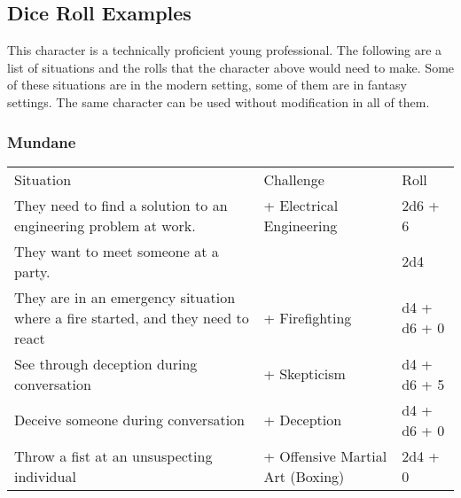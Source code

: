 \documentclass{LegrandOrangeTufteBook}
\begin{document}



\subsection*{Dice Roll Examples}

This character is a technically proficient young professional.
The following are a list of situations and the rolls that the character above would need to make.
Some of these situations are in the modern setting, some of them are in fantasy settings. The same character can be used without modification in all of them.

\subsubsection*{Mundane}

\begin{center}
	\begin{xltabular}{\textwidth}{Xll}
		Situation																		& Challenge 												& Roll \\
		They need to find a solution to an engineering problem at work.					&  + Electrical Engineering				& 2d6 + 6 \\
		They want to meet someone at a party.											& 								& 2d4 \\
		They are in an emergency situation where a fire started, and they need to react	&  + Firefighting 			& d4 + d6 + 0 \\
		See through deception during conversation										&  + Skepticism							& d4 + d6 + 5 \\
		Deceive someone during conversation 											&  + Deception						& d4 + d6 + 0 \\
		Throw a fist at an unsuspecting individual										&  + Offensive Martial Art (Boxing)	& 2d4 + 0 \\
	\end{xltabular}
\end{center}
\end{document}
